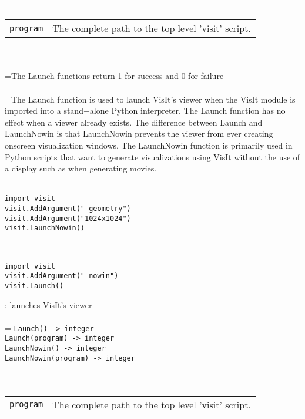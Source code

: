 \documentclass[10pt,a4paper]{report}
\begin{document}
 \\ 
\hangindent=\parindent 
\begin{tabular}{lp{9cm}}
\verb!program! & The complete path to the top level 'visit' script. \\
\end{tabular} \\[-2mm]


 \\ 
\hangindent=\parindent The Launch functions return 1 for success and 0 for failure \\[-3mm] 

 \\ 
\hangindent=\parindent The Launch function is used to launch VisIt's viewer when the VisIt module is imported into a stand$-$alone Python interpreter. The Launch function has no effect when a viewer already exists. The difference between Launch and LaunchNowin is that LaunchNowin prevents the viewer from ever creating onscreen visualization windows. The LaunchNowin function is primarily used in Python scripts that want to generate visualizations using VisIt without the use of a display such as when generating movies. \\[-3mm] 

\\[-6mm]
\begin{verbatim}import visit
visit.AddArgument("-geometry")
visit.AddArgument("1024x1024")
visit.LaunchNowin()
\end{verbatim}
\\[-6mm]
\begin{verbatim}import visit
visit.AddArgument("-nowin")
visit.Launch()
\end{verbatim}
\newpage


{}
: launches VisIt's viewer\\[-3mm]

 \\ 
\hangindent=\parindent 
\verb!Launch() -> integer!\\ 
\verb!Launch(program) -> integer!\\ 
\verb!LaunchNowin() -> integer!\\ 
\verb!LaunchNowin(program) -> integer!\\ [-3mm]

 \\ 
\hangindent=\parindent 
\begin{tabular}{lp{9cm}}
\verb!program! & The complete path to the top level 'visit' script. \\
\end{tabular} \\[-2mm]
\end{document}

